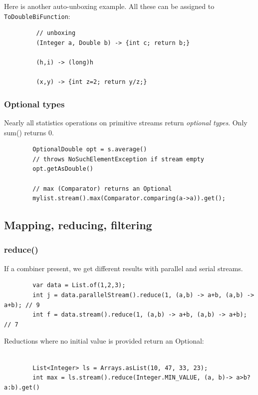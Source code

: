 \documentclass{scrartcl}
\begin{document}
     Here is another auto-unboxing example. All these can be assigned to \lstinline|ToDoubleBiFunction|:

     \begin{lstlisting}
         // unboxing
         (Integer a, Double b) -> {int c; return b;}

         (h,i) -> (long)h

         (x,y) -> {int z=2; return y/z;}
     \end{lstlisting}
\subsubsection{Optional types}

    Nearly all statistics operations on primitive streams return \textit{optional types}.
    Only sum() returns 0.

    \begin{lstlisting}
        OptionalDouble opt = s.average()
        // throws NoSuchElementException if stream empty
        opt.getAsDouble()

        // max (Comparator) returns an Optional
        mylist.stream().max(Comparator.comparing(a->a)).get();
    \end{lstlisting}

\subsection{Mapping, reducing, filtering}
\subsubsection{reduce()}

    If a combiner present, we get different results with parallel and serial streams.

    \begin{lstlisting}
        var data = List.of(1,2,3);
        int j = data.parallelStream().reduce(1, (a,b) -> a+b, (a,b) -> a+b); // 9
        int f = data.stream().reduce(1, (a,b) -> a+b, (a,b) -> a+b); // 7
    \end{lstlisting}

    Reductions where no initial value is provided return an Optional:

    \begin{lstlisting}

        List<Integer> ls = Arrays.asList(10, 47, 33, 23);
        int max = ls.stream().reduce(Integer.MIN_VALUE, (a, b)-> a>b?a:b).get()
    \end{lstlisting}
\end{document}
